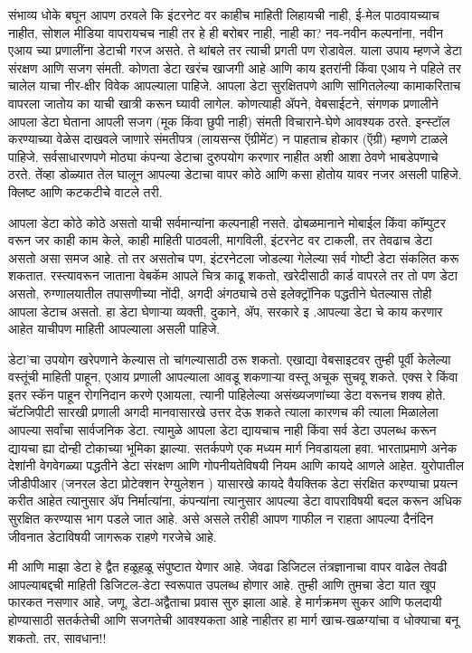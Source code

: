 संभाव्य धोके बघून आपण ठरवले कि इंटरनेट वर काहीच माहिती लिहायची नाही, ई-मेल पाठवायच्याच नाहीत, सोशल मीडिया वापरायचच नाही तर हे ही बरोबर नाही, नाही का? नव-नवीन कल्पनांना, नवीन एआय च्या प्रणालींना डेटाची गरज असते. ते थांबले तर त्याची प्रगती पण रोडावेल. याला उपाय म्हणजे डेटा संरक्षण आणि सजग संमती. कोणता डेटा खरंच खाजगी आहे आणि काय इतरांनी किंवा एआय ने पहिले तर चालेल याचा नीर-क्षीर विवेक आपल्याला पाहिजे. आपला डेटा सुरक्षितपणे आणि सांगितलेल्या कामाकरिताच वापरला जातोय का याची खात्री करून घ्यावी लागेल. कोणत्याही ॲपने, वेबसाईटने, संगणक प्रणालीने आपला डेटा घेताना आपली सजग (मूक किंवा छुपी नाही) संमती विचाराने-घेणे आवश्यक ठरते. इन्स्टॉल करण्याच्या वेळेस दाखवले जाणारे संमतीपत्र (लायसन्स ऍग्रीमेंट) न पाहताच होकार (ऍग्री) म्हणणे टाळले पाहिजे. सर्वसाधारणपणे मोठ्या कंपन्या डेटाचा दुरुपयोग करणार नाहीत अशी आशा ठेवणे भाबडेपणाचे ठरते. तेंव्हा डोळ्यात तेल घालून आपल्या डेटाचा वापर कोठे आणि कसा होतोय यावर नजर असली पाहिजे. क्लिष्ट आणि कटकटीचे वाटले तरी.

आपला डेटा कोठे कोठे असतो याची सर्वमान्यांना कल्पनाही नसते. ढोबळमानाने मोबाईल किंवा कॉम्पुटर वरून जर काही काम केले, काही माहिती पाठवली, मागविली, इंटरनेट वर टाकली, तर तेवढाच डेटा असतो असा समज आहे. तो तर असतोच पण, इंटरनेटला जोडल्या गेलेल्या सर्व गोष्टी डेटा संकलित करू शकतात. रस्त्यावरून जाताना वेबकॅम आपले चित्र काढू शकतो, खरेदीसाठी कार्ड वापरले तर तो पण डेटा असतो, रुग्णालयातील तपासणीच्या नोंदी, अगदी अंगठ्याचे ठसे इलेक्ट्रॉनिक पद्धतीने घेतल्यास तोही आपला डेटाच असतो. हा डेटा घेणाऱ्या व्यक्ती, दुकाने, ॲप, सरकारे इ .आपल्या डेटा चे काय करणार आहेत याचीपण माहिती आपल्याला असली पाहिजे.

डेटा'चा उपयोग खरेपणाने केल्यास तो चांगल्यासाठी ठरू शकतो. एखाद्या वेबसाइटवर तुम्ही पूर्वी केलेल्या वस्तूंची माहिती पाहून, एआय प्रणाली आपल्याला आवडू शकणाऱ्या वस्तू अचूक सुचवू शकते. एक्स रे किंवा इतर स्कॅन पाहून रोगनिदान करणे एआयला, त्यानी पाहिलेल्या असंख्यजणांच्या डेटा वरूनच शक्य होते. चॅटजिपीटी सारखी प्रणाली अगदी मानवासारखे उत्तर देऊ शकते त्याला कारणच की त्याला मिळालेला आपल्या सर्वांचा सार्वजनिक डेटा. त्यामुळे आपला डेटा द्यायचाच नाही किंवा सर्व डेटा उपलब्ध करून द्यायचा ह्या दोन्ही टोकाच्या भूमिका झाल्या. सतर्कपणे एक मध्यम मार्ग निवडायला हवा. भारताप्रमाणे अनेक देशांनी वेगवेगळ्या पद्धतीने डेटा संरक्षण आणि गोपनीयतेविषयी नियम आणि कायदे आणले आहेत. युरोपातील जीडीपीआर (जनरल डेटा प्रोटेक्शन रेग्युलेशन ) यासारखे कायदे वैयक्तिक डेटा संरक्षित करण्याचा प्रयत्न करीत आहेत त्यानुसार ॲप निर्मात्यांना, कंपन्यांना त्यानुसार आपल्या डेटा वापराविषयी बदल करून अधिक सुरक्षित करण्यास भाग पडले जात आहे. असे असले तरीही आपण गाफील न राहता आपल्या दैनंदिन जीवनात डेटाविषयी जागरूक राहणे गरजेचे आहे.

मी आणि माझा डेटा हे द्वैत हळूहळू संपुष्टात येणार आहे. जेवढा डिजिटल तंत्रज्ञानाचा वापर वाढेल तेवढी आपल्याबद्दची माहिती डिजिटल-डेटा स्वरूपात उपलब्ध होणार आहे. तुम्ही आणि तुमचा डेटा यात खूप फारकत नसणार आहे, जणू, डेटा-अद्वैताचा प्रवास सुरु झाला आहे. हे मार्गक्रमण सुकर आणि फलदायी होण्यासाठी सतर्कतेची आणि सजगतेची आवश्यकता आहे नाहीतर हा मार्ग खाच-खळग्यांचा व धोक्याचा बनू शकतो. तर, सावधान!!